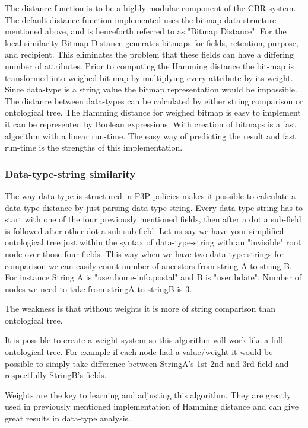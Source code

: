 The distance function is to be a highly modular component of the CBR system. The default distance function implemented uses the bitmap data structure mentioned above, and is henceforth referred to as "Bitmap Distance". For the local similarity Bitmap Distance generates bitmaps for fields, retention, purpose, and recipient. This eliminates the problem that these fields can have a differing number of attributes.  Prior to computing the Hamming distance the bit-map is transformed into weighed bit-map by multiplying every attribute by its weight. Since data-type is a string value the bitmap representation would be impossible. The distance between data-types can be calculated by either string comparison or ontological tree. The Hamming distance for weighed bitmap is easy to implement it can be represented by Boolean expressions. With creation of bitmaps is a fast algorithm with a linear run-time. The easy way of predicting the result and fast run-time is the strengths of this implementation.



\subsubsection{Data-type-string similarity}
The way data type is structured in P3P policies makes it possible to calculate a data-type distance by just parsing data-type-string. Every data-type string has to start with one of the four previously mentioned fields, then after a dot a sub-field is followed after other dot a sub-sub-field. Let us say we have your simplified ontological tree just within the syntax of data-type-string with an "invisible" root node over those four fields. This way when we have two data-type-strings for comparison we can easily count number of ancestors from string A to string B. For instance String A is "user.home-info.postal" and B is "user.bdate". Number of nodes we need to take from stringA to stringB is 3. 

The weakness is that without weights it is more of string comparison than ontological tree.

It is possible to create a weight system so this algorithm will work like a full ontological tree. For example if each node had a value/weight it would be possible to simply take difference between StringA's 1st 2nd and 3rd field and respectfully StringB's fields.
 
Weights are the key to learning and adjusting this algorithm. They are greatly used in previously mentioned implementation of Hamming distance and can give great results in data-type analysis.

